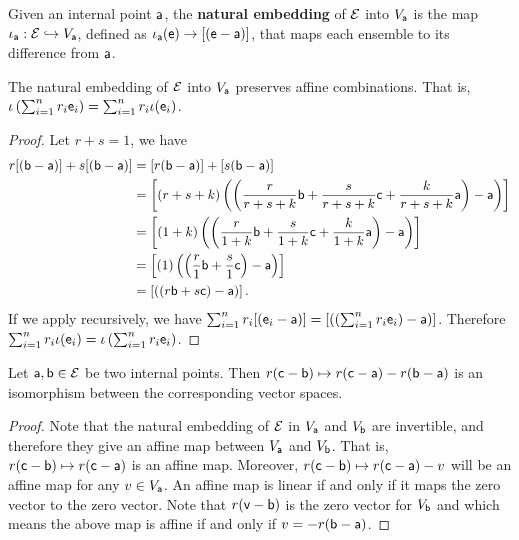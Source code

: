 \begin{mathSection}
	\begin{defn}
		Given an internal point $\ens[a]$, the \textbf{natural embedding} of $\Ens$ into $V_{\ens[a]}$ is the map $\iota_{\ens[a]} : \Ens \hookrightarrow V_{\ens[a]}$, defined as $\iota_{\ens[a]}(\ens) \to [(\ens - \ens[a])]$, that maps each ensemble to its difference from $\ens[a]$.
	\end{defn}
	
	\begin{coro}
		The natural embedding of $\Ens$ into $V_{\ens[a]}$ preserves affine combinations. That is, $\iota\left(\sum_{i=1}^n r_i \ens_i \right) = \sum_{i=1}^n r_i \iota(\ens_i)$.
	\end{coro}
	
	\begin{proof}
		Let $r+s=1$, we have
		\begin{equation}
			\begin{aligned}
				r[(\ens[b] - \ens[a])] +s[(\ens[b] - \ens[a])] &= [r(\ens[b] - \ens[a])] +[s(\ens[b] - \ens[a])] \\
				&= \left[(r+s+k) \left(\left(\frac{r}{r+s+k}\ens[b] + \frac{s}{r+s+k} \ens[c] +\frac{k}{r+s+k} \ens[a] \right) - \ens[a]\right)\right] \\
				&= \left[(1+k) \left(\left(\frac{r}{1+k}\ens[b] + \frac{s}{1+k} \ens[c] +\frac{k}{1+k} \ens[a] \right) - \ens[a]\right)\right] \\
				&= \left[(1) \left(\left(\frac{r}{1}\ens[b] + \frac{s}{1} \ens[c] \right) - \ens[a]\right)\right] \\
				&= \left[\left(\left(r\ens[b] + s \ens[c] \right) - \ens[a]\right)\right].
			\end{aligned}
		\end{equation}
		If we apply recursively, we have $\sum_{i=1}^{n} r_i [(\ens_i - \ens[a])] = \left[\left(\left(\sum_{i=1}^{n}r_i \ens_i\right) - \ens[a]\right)\right]$. Therefore $\sum_{i=1}^n r_i \iota(\ens_i) = \iota\left(\sum_{i=1}^n r_i \ens_i \right)$.
	\end{proof}
	
	\begin{prop}
		Let $\ens[a],\ens[b] \in \Ens$ be two internal points. Then $r(\ens[c] - \ens[b]) \mapsto r(\ens[c]-\ens[a]) - r(\ens[b]-\ens[a])$ is an isomorphism between the corresponding vector spaces.
	\end{prop}
	
	\begin{proof}
		Note that the natural embedding of $\Ens$ in $V_{\ens[a]}$ and $V_{\ens[b]}$ are invertible, and therefore they give an affine map between $V_{\ens[a]}$ and $V_{\ens[b]}$. That is, $r(\ens[c] - \ens[b]) \mapsto r(\ens[c]-\ens[a])$ is an affine map. Moreover, $r(\ens[c] - \ens[b]) \mapsto r(\ens[c]-\ens[a]) - v$ will be an affine map for any $v \in V_{\ens[a]}$. An affine map is linear if and only if it maps the zero vector to the zero vector. Note that $r(\ens[v] - \ens[b])$ is the zero vector for $V_{\ens[b]}$ and which means the above map is affine if and only if $v = -r(\ens[b]-\ens[a])$.
	\end{proof}
\end{mathSection}

